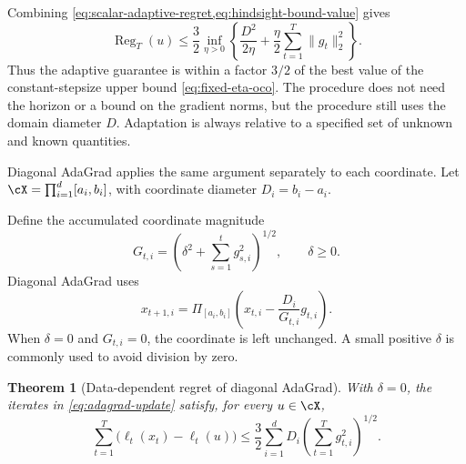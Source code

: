 \documentclass[11pt,twoside]{article}
\newtheorem{theorem}{Theorem}[section]
\theoremstyle{definition}
\theoremstyle{remark}
\begin{document}
Combining \cref{eq:scalar-adaptive-regret,eq:hindsight-bound-value} gives
\begin{equation}
 \operatorname{Reg}_T(u)
 \le\frac32
 \inf_{\eta>0}
 \left\{
  \frac{D^2}{2\eta}
  +\frac\eta2\sum_{t=1}^T\|g_t\|_2^2
 \right\}.
 \label{eq:scalar-adaptation-versus-hindsight}
\end{equation}
Thus the adaptive guarantee is within a factor $3/2$ of the best value of the
constant-stepsize upper bound \cref{eq:fixed-eta-oco}. The procedure does not
need the horizon or a bound on the gradient norms, but the procedure still
uses the domain diameter $D$. Adaptation is always relative to a specified set
of unknown and known quantities.

Diagonal AdaGrad applies the same argument separately to each coordinate.
Let $\cX=\prod_{i=1}^d[a_i,b_i]$, with coordinate diameter
$D_i=b_i-a_i$.

Define the accumulated coordinate magnitude
\begin{equation}
 G_{t,i}=\left(\delta^2+\sum_{s=1}^t g_{s,i}^2\right)^{1/2},
 \qquad \delta\ge0.
 \label{eq:adagrad-accumulator}
\end{equation}
Diagonal AdaGrad uses
\begin{equation}
 x_{t+1,i}
 =\Pi_{[a_i,b_i]}
  \left(x_{t,i}-\frac{D_i}{G_{t,i}}g_{t,i}\right).
 \label{eq:adagrad-update}
\end{equation}
When $\delta=0$ and $G_{t,i}=0$, the coordinate is left unchanged. A small
positive $\delta$ is commonly used to avoid division by zero.

\begin{theorem}[Data-dependent regret of diagonal AdaGrad]
\label{thm:adagrad-regret}
With $\delta=0$, the iterates in \cref{eq:adagrad-update} satisfy, for every
$u\in\cX$,
\begin{equation}
 \sum_{t=1}^T\bigl(\ell_t(x_t)-\ell_t(u)\bigr)
 \le\frac32\sum_{i=1}^d D_i
       \left(\sum_{t=1}^Tg_{t,i}^2\right)^{1/2}.
 \label{eq:adagrad-regret}
\end{equation}
\end{theorem}
\end{document}

